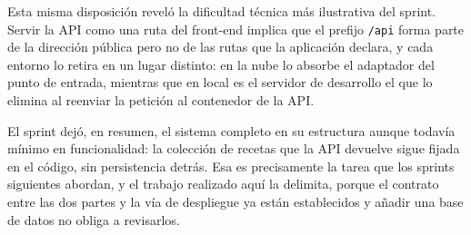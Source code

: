 Esta misma disposición reveló la dificultad técnica más ilustrativa del sprint.
Servir la API como una ruta del front-end implica que el prefijo \texttt{/api}
forma parte de la dirección pública pero no de las rutas que la aplicación
declara, y cada entorno lo retira en un lugar distinto: en la nube lo absorbe el
adaptador del punto de entrada, mientras que en local es el servidor de
desarrollo el que lo elimina al reenviar la petición al contenedor de la API.

El sprint dejó, en resumen, el sistema completo en su estructura aunque todavía
mínimo en funcionalidad: la colección de recetas que la API devuelve sigue fijada
en el código, sin persistencia detrás. Esa es precisamente la tarea que los
sprints siguientes abordan, y el trabajo realizado aquí la delimita, porque el
contrato entre las dos partes y la vía de despliegue ya están establecidos y
añadir una base de datos no obliga a revisarlos.
